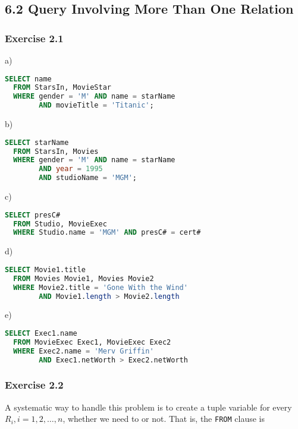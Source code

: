 \documentclass[../../main.tex]{subfiles}
\begin{document}
\subsection{6.2 Query Involving More Than One Relation}

\subsubsection*{Exercise 2.1}

a)

\begin{lstlisting}[language=sql]
  SELECT name
  FROM StarsIn, MovieStar
  WHERE gender = 'M' AND name = starName
        AND movieTitle = 'Titanic';
\end{lstlisting}

b)

\begin{lstlisting}[language=sql]
  SELECT starName
  FROM StarsIn, Movies
  WHERE gender = 'M' AND name = starName
        AND year = 1995
        AND studioName = 'MGM';
\end{lstlisting}

c)

\begin{lstlisting}[language=sql]
  SELECT presC#
  FROM Studio, MovieExec
  WHERE Studio.name = 'MGM' AND presC# = cert#
\end{lstlisting}

d)

\begin{lstlisting}[language=sql]
  SELECT Movie1.title
  FROM Movies Movie1, Movies Movie2
  WHERE Movie2.title = 'Gone With the Wind'
        AND Movie1.length > Movie2.length
\end{lstlisting}

e)

\begin{lstlisting}[language=sql]
  SELECT Exec1.name
  FROM MovieExec Exec1, MovieExec Exec2
  WHERE Exec2.name = 'Merv Griffin'
        AND Exec1.netWorth > Exec2.netWorth
\end{lstlisting}

\subsubsection*{Exercise 2.2}

A systematic way to handle this problem is to create
a tuple variable for every $R_{i}, i = 1,2,\dots,n$,
whether we need to or not. That is, the \verb|FROM|
clause is
\end{document}

